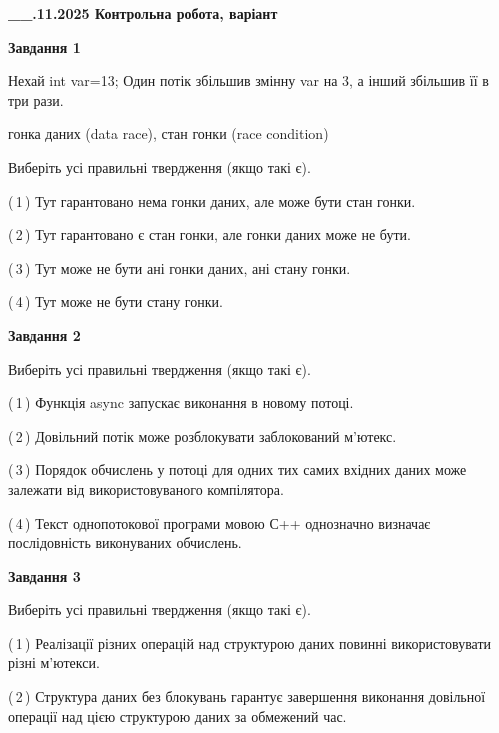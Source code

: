 \documentclass[12pt, ukrainian]{article}
\begin{document}
\begin {large}

\textbf{\_\_.11.2025 Контрольна робота, варіант  }\par


{

\begin{center}
\textbf{Завдання 1}
\end{center}
Нехай int var=13; Один потік збільшив змінну var на 3, а інший збільшив її в три рази.

гонка даних (data race), стан гонки (race condition)

Виберіть усі правильні твердження (якщо такі є).\par
\vspace{2mm}
(\,1\,) Тут гарантовано нема гонки даних, але може бути стан гонки.%

(\,2\,) Тут гарантовано є стан гонки, але гонки даних може не бути.%

(\,3\,) Тут може не бути ані гонки даних, ані стану гонки.%

(\,4\,) Тут може не бути стану гонки.%



\begin{center}
\textbf{Завдання 2}
\end{center}
Виберіть усі правильні твердження (якщо такі є).\par
\vspace{2mm}

(\,1\,) Функція async запускає виконання в новому потоці.%

(\,2\,) Довільний потік може розблокувати заблокований м’ютекс.%

(\,3\,) Порядок обчислень у потоці для одних тих самих вхідних даних може залежати від використовуваного компілятора.%

(\,4\,) Текст однопотокової програми мовою С++ однозначно визначає послідовність виконуваних обчислень.%



\begin{center}
\textbf{Завдання 3}
\end{center}
Виберіть усі правильні твердження (якщо такі є).\par
\vspace{2mm}

(\,1\,) Реалізації різних операцій над структурою даних повинні використовувати різні м’ютекси.%

(\,2\,) Структура даних без блокувань гарантує завершення виконання довільної операції над цією структурою даних за обмежений час.%

}
\end{large}
\end{document}
